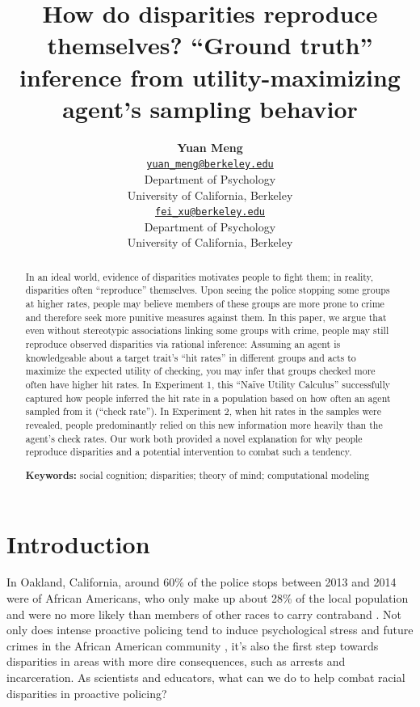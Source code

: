 \documentclass[10pt,letterpaper]{article}
\title{How do disparities reproduce themselves? ``Ground truth'' inference from utility-maximizing agent's sampling behavior}
\author{{\large \bf Yuan Meng} \\ \href{mailto:yuan_meng@berkeley.edu}{\texttt{yuan\_meng@berkeley.edu}} \\ Department of Psychology \\ University of California, Berkeley
     \And {\large \bf Fei Xu} \\ \href{mailto:fei_xu@berkeley.edu}{\texttt{fei\_xu@berkeley.edu}} \\ Department of Psychology \\ University of California, Berkeley
    }
\begin{document}
\maketitle

\begin{abstract}
In an ideal world, evidence of disparities motivates people to fight them; in reality, disparities often ``reproduce'' themselves. Upon seeing the police stopping some groups at higher rates, people may believe members of these groups are more prone to crime and therefore seek more punitive measures against them. In this paper, we argue that even without stereotypic associations linking some groups with crime, people may still reproduce observed disparities via rational inference: Assuming an agent is knowledgeable about a target trait's ``hit rates'' in different groups and acts to maximize the expected utility of checking, you may infer that groups checked more often have higher hit rates. In Experiment 1, this ``Na\"ive Utility Calculus'' successfully captured how people inferred the hit rate in a population based on how often an agent sampled from it (``check rate''). In Experiment 2, when hit rates in the samples were revealed, people predominantly relied on this new information more heavily than the agent's check rates. Our work both provided a novel explanation for why people reproduce disparities and a potential intervention to combat such a tendency.

\textbf{Keywords:} social cognition; disparities; theory of mind; computational modeling

\end{abstract}

\section{Introduction}
In Oakland, California, around 60\% of the police stops between 2013 and 2014 were of African Americans, who only make up about 28\% of the local population and were no more likely than members of other races to carry contraband \citep*{hetey2016data}. Not only does intense proactive policing tend to induce psychological stress and future crimes in the African American community \citep*{del2019criminogenic}, it's also the first step towards disparities in areas with more dire consequences, such as arrests and incarceration. As scientists and educators, what can we do to help combat racial disparities in proactive policing?
\end{document}
